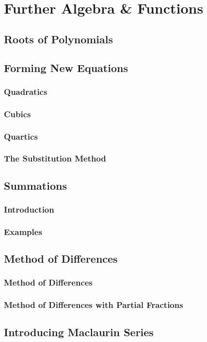 \documentclass[../alevelmaths.tex]{subfiles}
\begin{document}
\chapter{Further Algebra \& Functions}
\section{Roots of Polynomials}
\section{Forming New Equations}
\subsection*{Quadratics}
\subsection*{Cubics}
\subsection*{Quartics}
\subsection*{The Substitution Method}
\section{Summations}
\subsection*{Introduction}
\subsection*{Examples}
\section{Method of Differences}
\subsection*{Method of Differences}
\subsection*{Method of Differences with Partial Fractions}
\section{Introducing Maclaurin Series}
\end{document}
